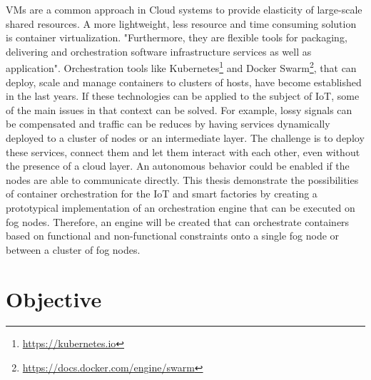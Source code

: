 \acp{VM} are a common approach in Cloud systems to provide elasticity of large-scale shared resources.\autocite[cf.][p. 117]{Pahl:2016}
A more lightweight, less resource and time consuming solution is container virtualization.
"Furthermore, they are flexible tools for packaging, delivering and orchestration software infrastructure services as well as application"\autocite[p. 117]{Pahl:2016}.
Orchestration tools like Kubernetes\footnote{\url{https://kubernetes.io}} and Docker Swarm\footnote{\url{https://docs.docker.com/engine/swarm}}, that can deploy, scale and manage containers to clusters of hosts, have become established in the last years.
If these technologies can be applied to the subject of \ac{IoT}, some of the main issues in that context can be solved.
For example, lossy signals can be compensated and traffic can be reduces by having services dynamically deployed to a cluster of nodes or an intermediate layer.
The challenge is to deploy these services, connect them and let them interact with each other, even without the presence of a cloud layer.
An autonomous behavior could be enabled if the nodes are able to communicate directly.
This thesis demonstrate the possibilities of container orchestration for the \ac{IoT} and smart factories by creating a prototypical implementation of an orchestration engine that can be executed on fog nodes.
Therefore, an engine will be created that can orchestrate containers based on functional and non-functional constraints onto a single fog node or between a cluster of fog nodes.


\section{Objective}



